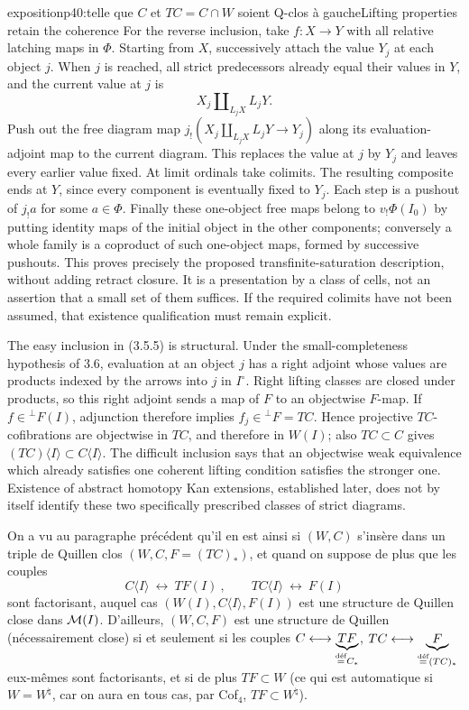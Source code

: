\begin{dcomment}{exposition}{p40:telle que $C$ et $TC=C\cap W$ soient Q-clos à gauche}{Lifting properties retain the coherence}
For the reverse inclusion, take $f:X\to Y$ with all relative latching maps in $\Phi$. Starting from $X$, successively attach the value $Y_j$ at each object $j$. When $j$ is reached, all strict predecessors already equal their values in $Y$, and the current value at $j$ is
\[
 X_j\amalg_{L_jX}L_jY.
\]
Push out the free diagram map $j_!(X_j\amalg_{L_jX}L_jY\to Y_j)$ along its evaluation-adjoint map to the current diagram. This replaces the value at $j$ by $Y_j$ and leaves every earlier value fixed. At limit ordinals take colimits. The resulting composite ends at $Y$, since every component is eventually fixed to $Y_j$. Each step is a pushout of $j_!a$ for some $a\in\Phi$. Finally these one-object free maps belong to $v_!\Phi(I_0)$ by putting identity maps of the initial object in the other components; conversely a whole family is a coproduct of such one-object maps, formed by successive pushouts. This proves precisely the proposed transfinite-saturation description, without adding retract closure. It is a presentation by a class of cells, not an assertion that a small set of them suffices. If the required colimits have not been assumed, that existence qualification must remain explicit.

The easy inclusion in (3.5.5) is structural. Under the small-completeness hypothesis of 3.6, evaluation at an object $j$ has a right adjoint whose values are products indexed by the arrows into $j$ in $I^\circ$. Right lifting classes are closed under products, so this right adjoint sends a map of $F$ to an objectwise $F$-map. If $f\in{}^\perp F(I)$, adjunction therefore implies $f_j\in{}^\perp F=TC$. Hence projective $TC$-cofibrations are objectwise in $TC$, and therefore in $W(I)$; also $TC\subset C$ gives $(TC)\langle I\rangle\subset C\langle I\rangle$. The difficult inclusion says that an objectwise weak equivalence which already satisfies one coherent lifting condition satisfies the stronger one. Existence of abstract homotopy Kan extensions, established later, does not by itself identify these two specifically prescribed classes of strict diagrams.
\end{dcomment}


On a vu au paragraphe précédent qu'il en est ainsi si $(W,C)$ s'insère dans un triple de Quillen clos $(W,C,F=(TC)_*)$, et quand on suppose de plus que les couples
\[
C\langle I\rangle \ \longleftrightarrow\ TF(I) \ , \qquad TC\langle I\rangle \ \longleftrightarrow\ F(I)
\]
sont factorisant, auquel cas $(W(I),C\langle I\rangle,F(I))$ est une structure de Quillen close dans $\M(I)$. D'ailleurs, $(W,C,F)$ est une structure de Quillen (nécessairement close) si et seulement si les couples $C\longleftrightarrow \underbrace{TF}_{\deq C_*}$, $TC\longleftrightarrow \underbrace{\ F\ }_{\deq (TC)_*}$ eux-mêmes sont factorisants, et si %
de plus $TF\subset W$ (ce qui est automatique si $W=W^{\natural}$, car on aura en tous cas, par Cof$_4$, $TF\subset W^{\natural}$).

